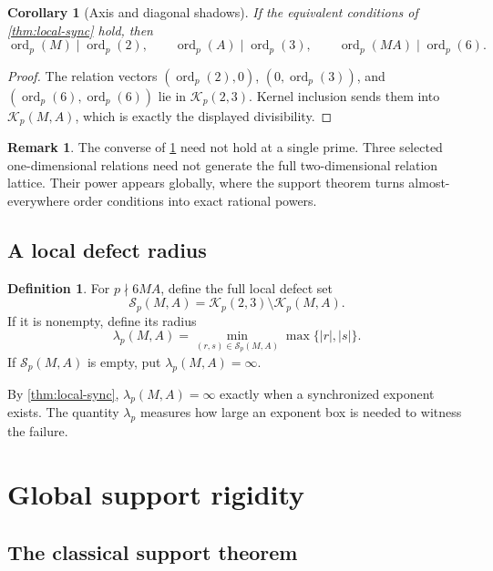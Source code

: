 \documentclass[11pt]{article}
\newtheorem{corollary}[theorem]{Corollary}
\theoremstyle{definition}
\newtheorem{definition}[theorem]{Definition}
\newtheorem{remark}[theorem]{Remark}
\newcommand{\ord}{\operatorname{ord}}
\newcommand{\Rel}{\mathcal K}
\newcommand{\Sync}{\mathcal S}
\begin{document}
\begin{corollary}[Axis and diagonal shadows]
\label{cor:axis-shadows}
If the equivalent conditions of \cref{thm:local-sync} hold, then
\[
 \ord_p(M)\mid\ord_p(2),\qquad
 \ord_p(A)\mid\ord_p(3),\qquad
 \ord_p(MA)\mid\ord_p(6).
\]
\end{corollary}

\begin{proof}
The relation vectors $(\ord_p(2),0)$, $(0,\ord_p(3))$, and
$(\ord_p(6),\ord_p(6))$ lie in $\Rel_p(2,3)$.  Kernel inclusion sends them into
$\Rel_p(M,A)$, which is exactly the displayed divisibility.
\end{proof}

\begin{remark}
The converse of \cref{cor:axis-shadows} need not hold at a single prime.  Three selected
one-dimensional relations need not generate the full two-dimensional relation lattice.
Their power appears globally, where the support theorem turns almost-everywhere order
conditions into exact rational powers.
\end{remark}

\subsection{A local defect radius}

\begin{definition}
For $p\nmid6MA$, define the full local defect set
\[
 \Sync_p(M,A)=\Rel_p(2,3)\setminus\Rel_p(M,A).
\]
If it is nonempty, define its radius
\begin{equation}
 \lambda_p(M,A)=
 \min_{(r,s)\in\Sync_p(M,A)}\max\{|r|,|s|\}.
 \label{eq:defect-radius}
\end{equation}
If $\Sync_p(M,A)$ is empty, put $\lambda_p(M,A)=\infty$.
\end{definition}

By \cref{thm:local-sync}, $\lambda_p(M,A)=\infty$ exactly when a synchronized exponent
exists.  The quantity $\lambda_p$ measures how large an exponent box is needed to witness the
failure.

\section{Global support rigidity}
\label{sec:support}

\subsection{The classical support theorem}
\end{document}
